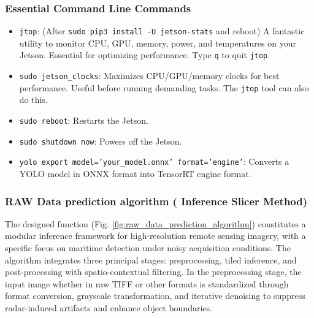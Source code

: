 \documentclass{article}
\begin{document}
	\subsubsection{Essential Command Line Commands}
	\begin{itemize}
		\item \texttt{jtop}: (After \texttt{sudo pip3 install -U jetson-stats} and reboot)  
		A fantastic utility to monitor CPU, GPU, memory, power, and temperatures on your Jetson.  
		Essential for optimizing performance. Type \texttt{q} to quit \texttt{jtop}.
		
		\item \texttt{sudo jetson\_clocks}:  
		Maximizes CPU/GPU/memory clocks for best performance.  
		Useful before running demanding tasks. The \texttt{jtop} tool can also do this.
		
		\item \texttt{sudo reboot}:  
		Restarts the Jetson.
		
		\item \texttt{sudo shutdown now}:  
		Powers off the Jetson.
		
		\item \texttt{yolo export model='your\_model.onnx' format='engine'}:  
		Converts a YOLO model in ONNX format into TensorRT engine format.
	\end{itemize}
	
	\subsubsection{RAW Data prediction algorithm ( Inference Slicer Method)}
	The designed function (Fig. \ref{fig:raw_data_prediction_algorithm}) constitutes a modular inference framework for high-resolution remote sensing imagery, with a specific focus on maritime detection under noisy acquisition conditions. 
	The algorithm integrates three principal stages: preprocessing, tiled inference, and post-processing with spatio-contextual filtering. In the preprocessing stage, the input image whether in raw TIFF or other formats is standardized through format conversion, grayscale transformation, and iterative denoising to suppress radar-induced artifacts and enhance object boundaries.\\
	
\end{document}
